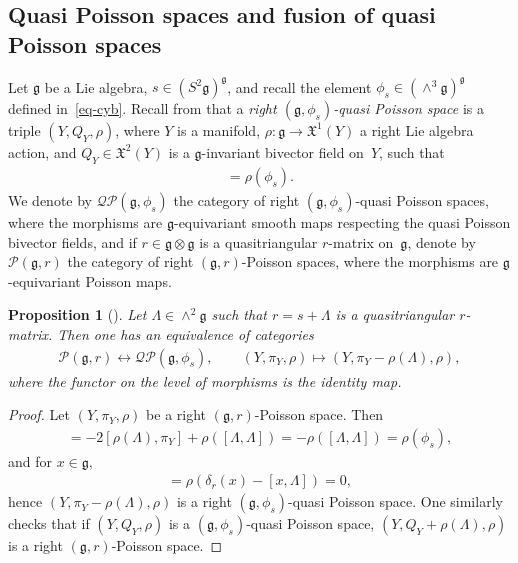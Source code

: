 \documentclass[pdftex]{sigma}
\numberwithin{equation}{section}
\newtheorem{Proposition}[Theorem]{Proposition}
{ \theoremstyle{definition}
\newtheorem{Definition}[Theorem]{Definition}
\newtheorem{Example}[Theorem]{Example}
\newtheorem{Remark}[Theorem]{Remark} }
\newcommand{\XX}{\mathfrak{X}}
\def \g {\mathfrak{a}}
\def \g {\mathfrak{g}}
\def \P {{\mathcal{P}}}
\def \Q {{\mathcal{Q}}}
\newcommand{\piY}{{\pi_{\scriptscriptstyle Y}}}
\begin{document}
\subsection{Quasi Poisson spaces and fusion of quasi Poisson spaces} \label{subsec-quasi}

Let $\g$ be a Lie algebra, $s \in (S^2\g)^\g$, and recall the element $\phi_s \in (\wedge^3 \g)^\g$ def\/ined in~\eqref{eq-cyb}. Recall from \cite{AA} that a {\it right $(\g, \phi_s)$-quasi Poisson space} is a triple $(Y, Q_Y, \rho)$, where $Y$ is a manifold, $\rho\colon \g \to \XX^1(Y)$ a right Lie algebra action, and $Q_Y \in \XX^2(Y)$ is a $\g$-invariant bivector f\/ield on~$Y$, such that
\begin{gather*}
[Q_Y, Q_Y] = \rho(\phi_s).
\end{gather*}
We denote by $\Q\P(\g, \phi_s)$ the category of right $(\g, \phi_s)$-quasi Poisson spaces, where the morphisms are $\g$-equivariant smooth maps respecting the quasi Poisson bivector f\/ields, and if $r \in \g \otimes \g$ is a quasitriangular $r$-matrix on~$\g$, denote by $\P(\g, r)$ the category of right $(\g, r)$-Poisson spaces, where the morphisms are $\g$-equivariant Poisson maps.

\begin{Proposition}[\cite{Anton-Yvette, David-Severa:quasi-Hamiltonian-groupoids, Lu-Mou:mixed}]\label{lem-equiv-quasi}
Let $\Lambda \in \wedge^2 \g$ such that $r = s + \Lambda$ is a quasitriangular $r$-matrix. Then one has an equivalence of categories
\begin{gather*}
\P(\g, r) \longleftrightarrow \Q\P(\g, \phi_s), \qquad (Y, \piY, \rho) \mapsto (Y, \piY - \rho(\Lambda), \rho), %
\end{gather*}
where the functor on the level of morphisms is the identity map.
\end{Proposition}
\begin{proof}
Let $(Y, \piY, \rho) $ be a right $(\g, r)$-Poisson space. Then
\begin{gather*}
[\piY - \rho(\Lambda), \piY - \rho(\Lambda)] = - 2[\rho(\Lambda), \piY] + \rho([\Lambda, \Lambda]) = -\rho([\Lambda, \Lambda]) = \rho(\phi_s),
\end{gather*}
and for $x \in \g$,
\begin{gather*}
[\rho(x), \piY - \rho(\Lambda)] = \rho(\delta_r(x) - [x, \Lambda]) = 0,
\end{gather*}
hence $(Y, \piY - \rho(\Lambda), \rho)$ is a right $(\g, \phi_s)$-quasi Poisson space. One similarly checks that if $(Y, Q_Y, \rho)$ is a $(\g, \phi_s)$-quasi Poisson space, $(Y, Q_Y + \rho(\Lambda), \rho)$ is a right $(\g, r)$-Poisson space.
\end{proof}
\end{document}
